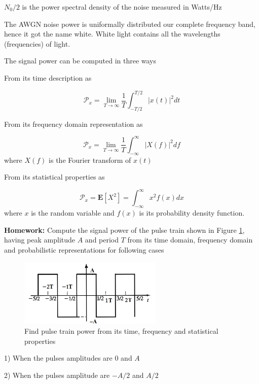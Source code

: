 \documentclass[a4paper]{article}
\numberwithin{equation}{subsection}
\begin{document}
	$N_0/2$ is the power spectral density of the noise measured in Watts/Hz
	
	The AWGN noise power is uniformally distributed our complete frequency band, hence it got the name white. White light contains all the wavelengths (frequencies) of light. 
	
	The signal power can be computed in three ways
	
	From its time description as
	
	\begin{equation}\label{key}
	\mathcal{P}_x = \lim_{T\rightarrow\infty}\frac{1}{T} \int_{-T/2}^{T/2} |x(t)|^2 dt
	\end{equation}
	
	From its frequency domain representation as 
	
	\begin{equation}\label{key}
	\mathcal{P}_x = \lim_{T\rightarrow\infty}\frac{1}{T} \int_{-\infty}^{\infty} |X(f)|^2 df
	\end{equation}
	where $X(f)$ is the Fourier transform of $x(t)$
	
	From its statistical properties as
	
	\begin{equation}\label{key}
	\mathcal{P}_x =  \mathbf{E}[X^2] = \int_{-\infty}^{\infty} x^2 f(x) dx
	\end{equation}
	where $x$ is the random variable and $f(x)$ is its probability density function.
	
	{\color{blue}
		\textbf{Homework:} Compute the signal power of the pulse train shown in Figure \ref{fig:fig227}, having peak amplitude $A$ and period $T$ from its time domain, frequency domain and probabilistic representations for following cases
		
		\begin{figure}
			\centering
			\includegraphics[width=2.7in]{../figures/fig2_27}
			\caption{Find pulse train power from its time, frequency and statistical properties}
			\label{fig:fig227}
		\end{figure}
		
		1) When the pulses amplitudes are $0$ and $A$
		
		2) When the pulses amplitude are $-A/2$ and $A/2$
	}
	
\end{document}
